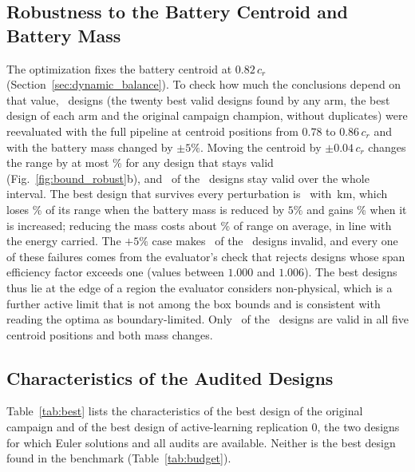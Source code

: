 \subsection{Robustness to the Battery Centroid and Battery Mass}
\label{sec:robustness}
The optimization fixes the battery centroid at $0.82\,c_{r}$ (Section~\ref{sec:dynamic_balance}). To check how much the conclusions depend on that value, \NrbN\ designs (the twenty best valid designs found by any arm, the best design of each arm and the original campaign champion, without duplicates) were reevaluated with the full pipeline at centroid positions from $0.78$ to $0.86\,c_{r}$ and with the battery mass changed by $\pm 5\%$. Moving the centroid by $\pm 0.04\,c_{r}$ changes the range by at most \NrbBandLossMax\% for any design that stays valid (Fig.~\ref{fig:bound_robust}b), and \NrbBandValid\ of the \NrbN\ designs stay valid over the whole interval. The best design that survives every perturbation is \NrbAllBest\ with \NrbAllBestRange\,km, which loses \NrbAllBestMfiveLoss\% of its range when the battery mass is reduced by $5\%$ and gains \NrbAllBestPfiveGain\% when it is increased; reducing the mass costs about \NrbMfiveLossMean\% of range on average, in line with the energy carried. The $+5\%$ case makes \NrbPfiveInvalid\ of the \NrbN\ designs invalid, and every one of these failures comes from the evaluator's check that rejects designs whose span efficiency factor exceeds one (values between $1.000$ and $1.006$). The best designs thus lie at the edge of a region the evaluator considers non-physical, which is a further active limit that is not among the box bounds and is consistent with reading the optima as boundary-limited. Only \NrbAllValid\ of the \NrbN\ designs are valid in all five centroid positions and both mass changes.

\subsection{Characteristics of the Audited Designs}
\label{sec:champion_characteristics}
Table~\ref{tab:best} lists the characteristics of the best design of the original campaign and of the best design of active-learning replication 0, the two designs for which Euler solutions and all audits are available. Neither is the best design found in the benchmark (Table~\ref{tab:budget}).

